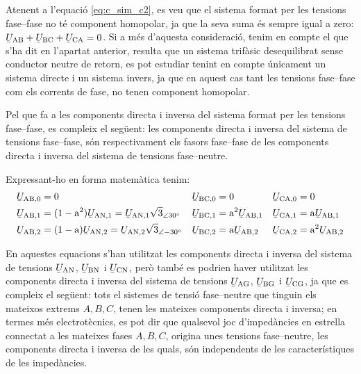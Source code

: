 \begin{center}
    
    \label{pic:Comp_sim_tens}
\end{center}

Atenent a l'equació \eqref{eq:c_sim_c2}, es veu que el sistema
format per les tensions fase--fase no té component homopolar, ja que
la seva suma  és sempre igual a zero: $\cmplx{U}\ped{AB} +
\cmplx{U}\ped{BC} + \cmplx{U}\ped{CA} = 0$. Si a més
d'aquesta consideració, tenim en compte el que s'ha dit en l'apartat
anterior, resulta que un sistema trifàsic desequilibrat sense conductor
neutre de retorn, es pot estudiar tenint en compte únicament un sistema directe
i un sistema invers, ja que en aquest cas tant les tensions fase--fase com els
corrents de fase, no tenen component homopolar.

Pel que fa a les components directa i inversa del sistema format per
les tensions fase--fase, es compleix el següent: les components
directa i inversa del sistema de tensions fase--fase, són
respectivament els fasors fase--fase de les components directa i
inversa del sistema de tensions fase--neutre.

Expressant-ho en forma matemàtica tenim:
\begin{subequations}
\begin{align}
   \cmplx{U}\ped{AB,0} &= 0 &
   \cmplx{U}\ped{BC,0} &= 0 &
   \cmplx{U}\ped{CA,0} &= 0 \\
   \cmplx{U}\ped{AB,1} &= (1-\au^2) \cmplx{U}\ped{AN,1} =
   \cmplx{U}\ped{AN,1} \sqrt{3}_{\angle\ang{30}} &
   \cmplx{U}\ped{BC,1} &= \au^2 \cmplx{U}\ped{AB,1} &
   \cmplx{U}\ped{CA,1} &= \au \cmplx{U}\ped{AB,1} \label{eq:c_sim_a3} \\
   \cmplx{U}\ped{AB,2} &= (1-\au) \cmplx{U}\ped{AN,2}  =
   \cmplx{U}\ped{AN,2} \sqrt{3}_{\angle\ang{-30}}&
   \cmplx{U}\ped{BC,2} &= \au \cmplx{U}\ped{AB,2} &
   \cmplx{U}\ped{CA,2} &= \au^2 \cmplx{U}\ped{AB,2} \label{eq:c_sim_b3}
\end{align}
\end{subequations}

En aquestes equacions s'han utilitzat les components directa i
inversa del sistema de tensions
$\cmplx{U}\ped{AN}$, $\cmplx{U}\ped{BN}$ i $\cmplx{U}\ped{CN}$,
però també es podrien haver utilitzat les components directa i
inversa del sistema de tensions
$\cmplx{U}\ped{AG}$, $\cmplx{U}\ped{BG}$ i $\cmplx{U}\ped{CG}$,
ja que es compleix el següent: tots el sistemes de tensió
fase--neutre que tinguin els mateixos extrems $A, B,
C$, tenen les mateixes components directa i inversa; en termes
més electrotècnics, es pot dir que qualsevol joc d'impedàncies en
estrella connectat a les mateixes fases $A, B, C$,
origina unes tensions fase--neutre, les components directa i inversa
de les quals, són independents de les característiques de les
impedàncies.

